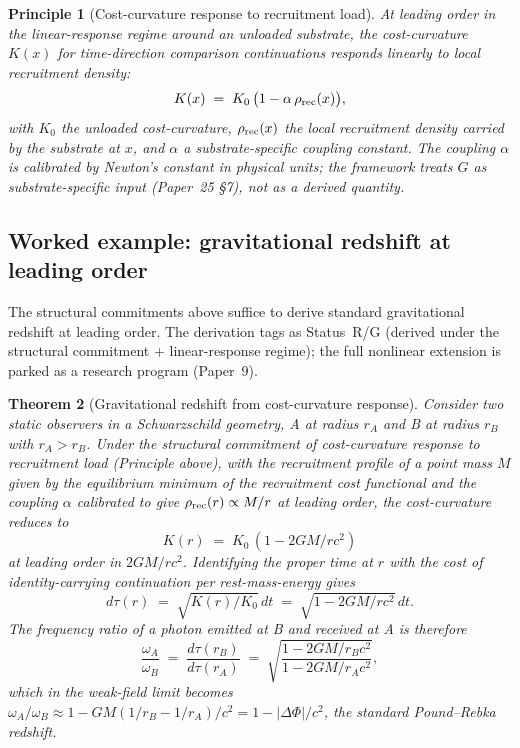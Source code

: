 \documentclass[11pt]{article}
\newtheorem{theorem}{Theorem}[section]
\newtheorem{principle}[theorem]{Principle}
\theoremstyle{remark}
\newcommand{\Status}[1]{\textsf{#1}}
\begin{document}
\begin{principle}[Cost-curvature response to recruitment load]
At leading order in the linear-response regime around an unloaded substrate, the cost-curvature $K(x)$ for time-direction comparison continuations responds linearly to local recruitment density:
\[
        K(x) \;=\; K_0\,\big(1 - \alpha\,\rho_{\rm rec}(x)\big),
\]
with $K_0$ the unloaded cost-curvature, $\rho_{\rm rec}(x)$ the local recruitment density carried by the substrate at $x$, and $\alpha$ a substrate-specific coupling constant.  The coupling $\alpha$ is calibrated by Newton's constant in physical units; the framework treats $G$ as substrate-specific input (Paper~25 \S 7), not as a derived quantity.
\end{principle}

\subsection{Worked example: gravitational redshift at leading order}

The structural commitments above suffice to derive standard gravitational redshift at leading order.  The derivation tags as Status~\Status{R/G} (derived under the structural commitment + linear-response regime); the full nonlinear extension is parked as a research program (Paper~9).

\begin{theorem}[Gravitational redshift from cost-curvature response]
\label{thm:redshift}
Consider two static observers in a Schwarzschild geometry, A at radius $r_A$ and B at radius $r_B$ with $r_A > r_B$.  Under the structural commitment of cost-curvature response to recruitment load (Principle above), with the recruitment profile of a point mass $M$ given by the equilibrium minimum of the recruitment cost functional and the coupling $\alpha$ calibrated to give $\rho_{\rm rec}(r) \propto M/r$ at leading order, the cost-curvature reduces to
\[
        K(r) \;=\; K_0\,(1 - 2GM/rc^2)
\]
at leading order in $2GM/rc^2$.  Identifying the proper time at $r$ with the cost of identity-carrying continuation per rest-mass-energy gives
\[
        d\tau(r) \;=\; \sqrt{K(r)/K_0}\,dt \;=\; \sqrt{1 - 2GM/rc^2}\,dt.
\]
The frequency ratio of a photon emitted at B and received at A is therefore
\[
        \frac{\omega_A}{\omega_B} \;=\; \frac{d\tau(r_B)}{d\tau(r_A)}
        \;=\; \sqrt{\frac{1 - 2GM/r_Bc^2}{1 - 2GM/r_Ac^2}},
\]
which in the weak-field limit becomes $\omega_A/\omega_B \approx 1 - GM(1/r_B - 1/r_A)/c^2 = 1 - |\Delta\Phi|/c^2$, the standard Pound--Rebka redshift.
\end{theorem}
\end{document}
